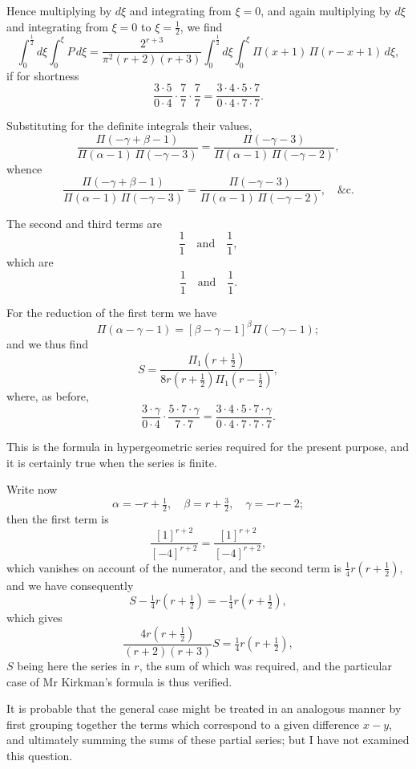 \documentclass[11pt,a4paper]{book}
\begin{document}
{{Hence multiplying by $d\xi$ and integrating from $\xi=0$, and again multiplying by $d\xi$ and integrating from $\xi=0$ to $\xi=\tfrac{1}{2}$, we find
\[
\int_0^{\frac{1}{2}} d\xi \int_0^{\xi} P\,d\xi = \frac{2^{r+3}}{\pi^2(r+2)(r+3)} \int_0^{\frac{1}{2}} d\xi \int_0^{\xi} \Pi(x+1)\,\Pi(r-x+1)\,d\xi,
\]
if for shortness
\[
\frac{3 \cdot 5}{0 \cdot 4} \cdot \frac{7}{7} \cdot \frac{7}{7} = \frac{3 \cdot 4 \cdot 5 \cdot 7}{0 \cdot 4 \cdot 7 \cdot 7}.
\]

Substituting for the definite integrals their values,
\[
\frac{\Pi(-\gamma+\beta-1)}{\Pi(\alpha-1)\,\Pi(-\gamma-3)} = \frac{\Pi(-\gamma-3)}{\Pi(\alpha-1)\,\Pi(-\gamma-2)},
\]
whence
\[
\frac{\Pi(-\gamma+\beta-1)}{\Pi(\alpha-1)\,\Pi(-\gamma-3)} = \frac{\Pi(-\gamma-3)}{\Pi(\alpha-1)\,\Pi(-\gamma-2)}, \quad \text{&c.}
\]

The second and third terms are
\[
\frac{1}{1} \quad \text{and} \quad \frac{1}{1},
\]
which are
\[
\frac{1}{1} \quad \text{and} \quad \frac{1}{1}.
\]

For the reduction of the first term we have
\[
\Pi(\alpha - \gamma - 1) = [\beta - \gamma - 1]^\beta \Pi(-\gamma - 1);
\]
and we thus find
\[
S = \frac{\Pi_1(r + \tfrac{1}{2})}{8r(r + \tfrac{1}{2})\Pi_1(r - \tfrac{1}{2})},
\]
where, as before,
\[
\frac{3 \cdot \gamma}{0 \cdot 4} \cdot \frac{5 \cdot 7 \cdot \gamma}{7 \cdot 7} = \frac{3 \cdot 4 \cdot 5 \cdot 7 \cdot \gamma}{0 \cdot 4 \cdot 7 \cdot 7 \cdot 7}.
\]

This is the formula in hypergeometric series required for the present purpose, and it is certainly true when the series is finite.

Write now
\[
\alpha = -r + \tfrac{1}{2}, \quad \beta = r + \tfrac{3}{2}, \quad \gamma = -r - 2;
\]
then the first term is
\[
\frac{[1]^{r+2}}{[-4]^{r+2}} = \frac{[1]^{r+2}}{[-4]^{r+2}},
\]
which vanishes on account of the numerator, and the second term is $\tfrac{1}{4}r(r+\tfrac{1}{2})$, and we have consequently
\[
S - \tfrac{1}{4}r(r + \tfrac{1}{2}) = -\tfrac{1}{4}r(r + \tfrac{1}{2}),
\]
which gives
\[
\frac{4r(r+\tfrac{1}{2})}{(r+2)(r+3)} S = \tfrac{1}{4}r(r + \tfrac{1}{2}),
\]
$S$ being here the series in $r$, the sum of which was required, and the particular case of Mr Kirkman's formula is thus verified.

It is probable that the general case might be treated in an analogous manner by first grouping together the terms which correspond to a given difference $x-y$, and ultimately summing the sums of these partial series; but I have not examined this question.

}}
\end{document}
